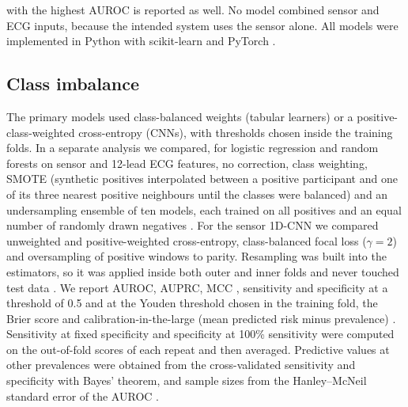 \documentclass[11pt]{article}
\begin{document}
with the highest AUROC is reported as well. No model combined sensor and ECG inputs, because the intended system uses the sensor alone. All models were implemented in Python with scikit-learn and PyTorch \cite{paszke2019pytorch}.

\subsection*{Class imbalance}
The primary models used class-balanced weights (tabular learners) or a positive-class-weighted cross-entropy (CNNs), with thresholds chosen inside the training folds. In a separate analysis we compared, for logistic regression and random forests on sensor and 12-lead ECG features, no correction, class weighting, SMOTE \cite{chawla2002smote} (synthetic positives interpolated between a positive participant and one of its three nearest positive neighbours until the classes were balanced) and an undersampling ensemble of ten models, each trained on all positives and an equal number of randomly drawn negatives \cite{liu2009exploratory}. For the sensor 1D-CNN we compared unweighted and positive-weighted cross-entropy, class-balanced focal loss ($\gamma=2$) \cite{lin2017focal} and oversampling of positive windows to parity. Resampling was built into the estimators, so it was applied inside both outer and inner folds and never touched test data \cite{he2009learning}. We report AUROC, AUPRC, MCC \cite{chicco2020advantages}, sensitivity and specificity at a threshold of 0.5 and at the Youden threshold chosen in the training fold, the Brier score and calibration-in-the-large (mean predicted risk minus prevalence) \cite{vancalster2019calibration}. Sensitivity at fixed specificity and specificity at 100\% sensitivity were computed on the out-of-fold scores of each repeat and then averaged. Predictive values at other prevalences were obtained from the cross-validated sensitivity and specificity with Bayes' theorem, and sample sizes from the Hanley--McNeil standard error of the AUROC \cite{hanley1982meaning,riley2020calculating}.
\end{document}
